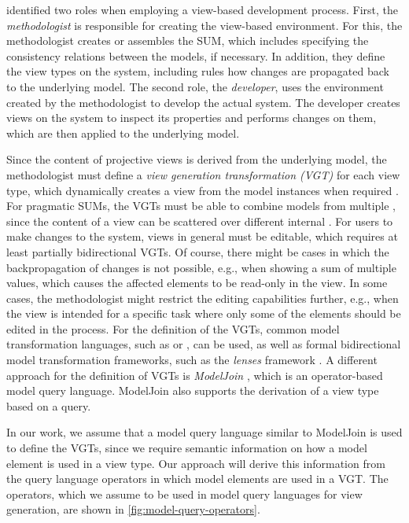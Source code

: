 \Textcite{atkinson_orthographic_2010} identified two roles when employing a view-based development process.
First, the \emph{methodologist} is responsible for creating the view-based environment.
For this, the methodologist creates or assembles the SUM, which includes specifying the consistency relations between the models, if necessary.
In addition, they define the view types on the system, including rules how changes are propagated back to the underlying model.
The second role, the \emph{developer}, uses the environment created by the methodologist to develop the actual system.
The developer creates views on the system to inspect its properties and performs changes on them, which are then applied to the underlying model.

Since the content of projective views is derived from the underlying model, the methodologist must define a \emph{view generation transformation (VGT)} for each view type, which dynamically creates a view from the model instances when required \autocite{tunjic_synchronization_2015}.
For pragmatic SUMs, the VGTs must be able to combine models from multiple \metamodels, since the content of a view can be scattered over different internal \metamodels \autocite{burger_flexible_2014}.
For users to make changes to the system, views in general must be editable, which requires at least partially bidirectional VGTs.
Of course, there might be cases in which the backpropagation of changes is not possible, e.g., when showing a sum of multiple values, which causes the affected elements to be read-only in the view.
In some cases, the methodologist might restrict the editing capabilities further, e.g., when the view is intended for a specific task where only some of the elements should be edited in the process.
For the definition of the VGTs, common model transformation languages, such as \cite{omg_qvt} or \cite{eclipse_atl}, can be used, as well as formal bidirectional model transformation frameworks, such as the \emph{lenses} framework \autocite{foster_combinators_2007}.
A different approach for the definition of VGTs is \emph{ModelJoin} \autocite{burger_model-join_2016}, which is an operator-based model query language.
ModelJoin also supports the derivation of a view type based on a query.

In our work, we assume that a model query language similar to ModelJoin is used to define the VGTs, since we require semantic information on how a model element is used in a view type.
Our approach will derive this information from the query language operators in which model elements are used in a VGT.
The operators, which we assume to be used in model query languages for view generation, are shown in \autoref{fig:model-query-operators}.

